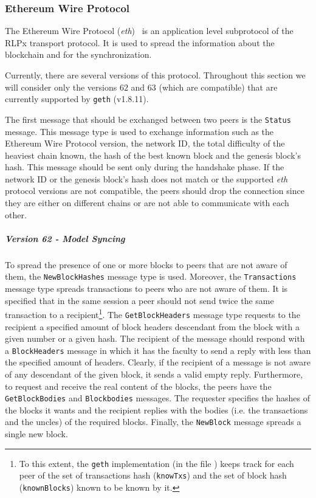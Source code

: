 \subsubsection{Ethereum Wire Protocol}
\label{sec:ethereum-wire-protocol}

The Ethereum Wire Protocol (\emph{eth})~\cite{bib:ethereumwireprotocol} is an
application level subprotocol of the RLPx transport protocol. It is used to
spread the information about the blockchain and for the synchronization.

Currently, there are several versions of this protocol. Throughout this section
we will consider only the versions $62$ and $63$ (which are compatible) that are
currently supported by \texttt{geth} (v1.8.11).

The first message that should be exchanged between two peers is the
\texttt{Status} message. This message type is used to exchange information such
as the Ethereum Wire Protocol version, the network ID, the total difficulty of
the heaviest chain known, the hash of the best known block and the genesis
block's hash. This message should be sent only during the handshake phase. If
the network ID or the genesis block's hash does not match or the supported
\emph{eth} protocol versions are not compatible, the peers should drop the
connection since they are either on different chains or are not able to
communicate with each other.

\subparagraph{Version 62 - Model Syncing}
To spread the presence of one or more blocks to peers that are not aware of
them, the \texttt{NewBlockHashes} message type is used. Moreover, the
\texttt{Transactions} message type spreads transactions to peers who are not
aware of them. It is specified that in the same session a peer should not send
twice the same transaction to a recipient\footnote{To this extent, the
\texttt{geth} implementation (in the file ) keeps track for
each peer of the set of transactions hash (\texttt{knowTxs}) and the set of
block hash (\texttt{knownBlocks}) known to be known by it.}. The
\texttt{GetBlockHeaders} message type requests to the recipient a specified
amount of block headers descendant from the block with a given number or a given
hash. The recipient of the message should respond with a \texttt{BlockHeaders}
message in which it has the faculty to send a reply with less than the specified
amount of headers. Clearly, if the recipient of a message is not aware of any
descendant of the given block, it sends a valid empty reply. Furthermore, to
request and receive the real content of the blocks, the peers have the
\texttt{GetBlockBodies} and \texttt{Blockbodies} messages. The requester
specifies the hashes of the blocks it wants and the recipient replies with the
bodies (i.e. the transactions and the uncles) of the required blocks. Finally,
the \texttt{NewBlock} message spreads a single new block.

